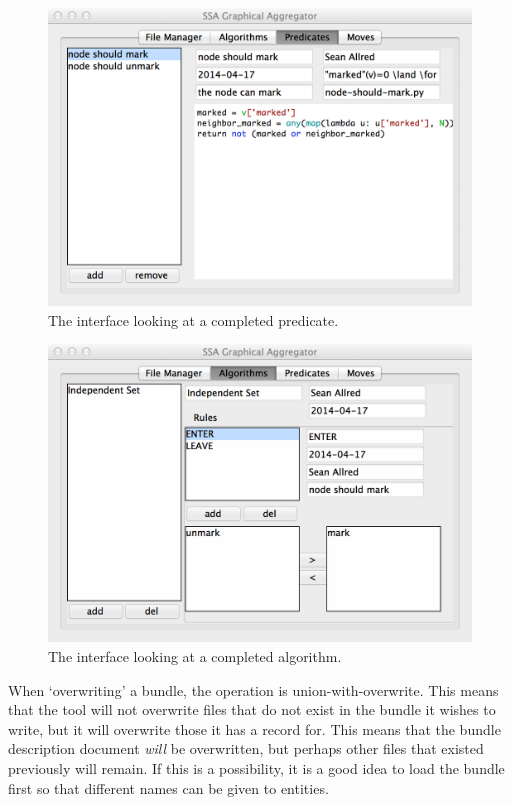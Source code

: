 \begin{figure}[p]
  \centering
  \includegraphics[height=.4\textheight]{figs/2}
  \caption{The interface looking at a completed predicate.}
  \label{fig:ex:predicates}
\end{figure}
\begin{figure}[p]
  \centering
  \includegraphics[height=.4\textheight]{figs/4}
  \caption{The interface looking at a completed algorithm.}
  \label{fig:ex:algorithm}
\end{figure}

\begin{warning}
  When \enquote*{overwriting} a bundle, the operation is union-with-overwrite.
  This means that the tool will not overwrite files that do not exist in the bundle it wishes to write,
    but it will overwrite those it has a record for.
  This means that the bundle description document \emph{will} be overwritten,
    but perhaps other files that existed previously will remain.
  If this is a possibility, it is a good idea to load the bundle first so that different names can be given to entities.
\end{warning}


